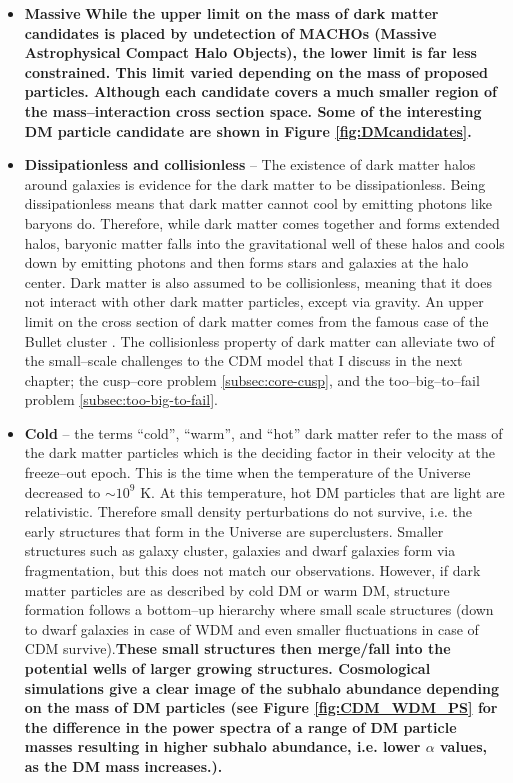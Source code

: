 \documentclass[a4wide,12pt]{book}
\begin{document}
  \begin{itemize}
  \item {\bf Massive} {\bf While the upper limit on the mass of dark matter candidates is placed by undetection of MACHOs (Massive Astrophysical Compact Halo Objects), the lower limit is far less constrained. This limit varied depending on the mass of proposed particles. Although each candidate covers a much smaller region of the mass--interaction cross section space. Some of the interesting DM particle candidate are shown in Figure \ref{fig:DMcandidates}. } 
  \item {\bf Dissipationless and collisionless} -- The existence of dark matter halos around galaxies is evidence for the dark matter to be dissipationless. Being dissipationless means that dark matter cannot cool by emitting photons like baryons do. Therefore, while dark matter comes together and forms extended halos, baryonic matter falls into the gravitational well of these halos and cools down by emitting photons and then forms stars and galaxies at the halo center. Dark matter is also assumed to be collisionless, meaning that it does not interact with other dark matter particles, except via gravity. An upper limit on the cross section of dark matter comes from the famous case of the Bullet cluster \citep[][]{Clowe+2006}. The collisionless property of dark matter can alleviate two of the small--scale challenges to the CDM model that I discuss in the next chapter; the cusp--core problem \ref{subsec:core-cusp}, and the too--big--to--fail problem \ref{subsec:too-big-to-fail}.
  \item {\bf Cold} -- the terms ``cold'', ``warm'', and ``hot'' dark matter refer to the mass of the dark matter particles which is the deciding factor in their velocity at the freeze--out epoch. This is the time when the temperature of the Universe decreased to $\sim 10^9$ K. At this temperature, hot DM particles that are light are relativistic. Therefore small density perturbations do not survive, i.e. the early structures that form in the Universe are superclusters. Smaller structures such as galaxy cluster, galaxies and dwarf galaxies form via fragmentation, but this does not match our observations. However, if dark matter particles are as described by cold DM or warm DM, structure formation follows a bottom--up hierarchy where small scale structures (down to dwarf galaxies in case of WDM and even smaller fluctuations in case of CDM survive).{\bf These small structures then merge/fall into the potential wells of larger growing structures. Cosmological simulations give a clear image of the subhalo abundance depending on the mass of DM particles (see Figure \ref{fig:CDM_WDM_PS} for the difference in the power spectra of a range of DM particle masses resulting in higher subhalo abundance, i.e. lower $\alpha$ values, as the DM mass increases.).}
  \end{itemize}
\end{document}
